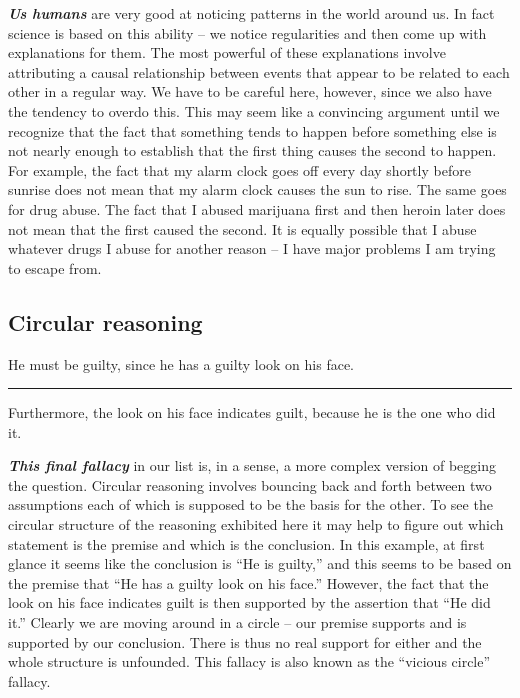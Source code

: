 \documentclass[]{book}
\makeatletter
\newenvironment{kframe}{%
\medskip{}
\setlength{\fboxsep}{.8em}
 \def\at@end@of@kframe{}%
 \ifinner\ifhmode%
  \def\at@end@of@kframe{\end{minipage}}%
  \begin{minipage}{\columnwidth}%
 \fi\fi%
 \def\FrameCommand##1{\hskip\@totalleftmargin \hskip-\fboxsep
 \colorbox{shadecolor}{##1}\hskip-\fboxsep
     \hskip-\linewidth \hskip-\@totalleftmargin \hskip\columnwidth}%
 \MakeFramed {\advance\hsize-\width
   \@totalleftmargin\z@ \linewidth\hsize
   \@setminipage}}%
 {\par\unskip\endMakeFramed%
 \at@end@of@kframe}
\newenvironment{rmdblock}[1]
  {
  \begin{itemize}
  \renewcommand{\labelitemi}{
    \raisebox{-.7\height}[0pt][0pt]{
      {\setkeys{Gin}{width=3em,keepaspectratio}\texttt{[image: img/\#1]}}
    }
  }
  \setlength{\fboxsep}{1em}
  \begin{kframe}
  \item
  }
  {
  \end{kframe}
  \end{itemize}
  }
\newenvironment{rmdwarning}
  {\begin{rmdblock}{warning}}
  {\end{rmdblock}}
\makeatother
\begin{document}
\textbf{\emph{Us humans}} are very good at noticing patterns in the world around us. In fact science is based on this ability -- we notice regularities and then come up with explanations for them. The most powerful of these explanations involve attributing a causal relationship between events that appear to be related to each other in a regular way. We have to be careful here, however, since we also have the tendency to overdo this. This may seem like a convincing argument until we recognize that the fact that something tends to happen before something else is not nearly enough to establish that the first thing causes the second to happen. For example, the fact that my alarm clock goes off every day shortly before sunrise does not mean that my alarm clock causes the sun to rise. The same goes for drug abuse. The fact that I abused marijuana first and then heroin later does not mean that the first caused the second. It is equally possible that I abuse whatever drugs I abuse for another reason -- I have major problems I am trying to escape from.

\hypertarget{circular-reasoning}{%
\subsection*{Circular reasoning}\label{circular-reasoning}}


\begin{rmdwarning}
He must be guilty, since he has a guilty look on his face.

\begin{center}\rule{0.5\linewidth}{\linethickness}\end{center}

Furthermore, the look on his face indicates guilt, because he is the one
who did it.
\end{rmdwarning}

\textbf{\emph{This final fallacy}} in our list is, in a sense, a more complex version of begging the question. Circular reasoning involves bouncing back and forth between two assumptions each of which is supposed to be the basis for the other. To see the circular structure of the reasoning exhibited here it may help to figure out which statement is the premise and which is the conclusion. In this example, at first glance it seems like the conclusion is ``He is guilty,'' and this seems to be based on the premise that ``He has a guilty look on his face.'' However, the fact that the look on his face indicates guilt is then supported by the assertion that ``He did it.'' Clearly we are moving around in a circle -- our premise supports and is supported by our conclusion. There is thus no real support for either and the whole structure is unfounded. This fallacy is also known as the ``vicious circle'' fallacy.
\end{document}
